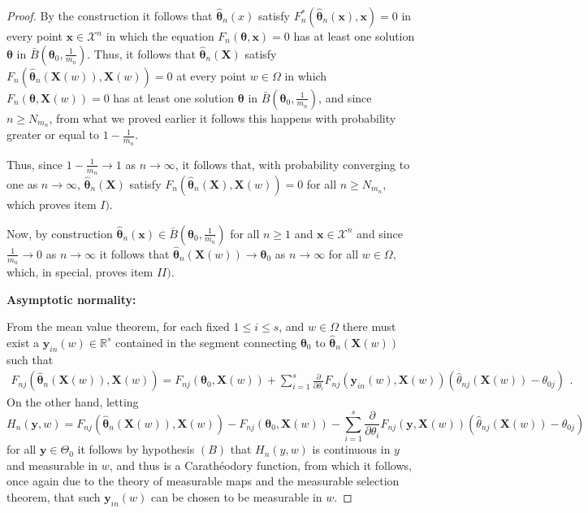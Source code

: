\documentclass[lineno]{biometrika}
\newcommand{\bs}{\boldsymbol}
\begin{document}
\begin{proof}
By the construction it follows that
$\bs{\hat{\theta}}_n(x)$ satisfy $F^*_n(\bs{\hat{\theta}}_n(\bs{x}),\bs{x})=0$ in every point $\bs{x}\in \mathcal{X}^n$ in which the equation $F_n(\bs{\theta},\bs{x})=0$ has at least one solution $\bs{\theta}$ in $\bar{B}\left(\bs{\theta}_0,\frac{1}{m_n}\right)$.
Thus, it follows that $\bs{\hat{\theta}}_n(\bs{X})$ satisfy $F_n(\bs{\hat{\theta}}_n(\bs{X}(w)),\bs{X}(w))=0$ at every point $w\in \Omega$ in which $F_n(\bs{\theta},\bs{X}(w))=0$ has at least one solution $\bs{\theta}$ in $\bar{B}\left(\bs{\theta}_0,\frac{1}{m_n}\right)$, and since $n\geq N_{m_n}$, from what we proved earlier it follows this happens with probability greater or equal to $1-\frac{1}{m_n}$. 

Thus, since $1-\frac{1}{m_n}\to 1$ as $n\to \infty$, it follows that, with probability converging to one as $n\to \infty$, $\hat{\bs{\theta}}_n(\bs{X})$ satisfy $F_n\left(\bs{\hat{\theta}}_n(\bs{X}),\bs{X}(w)\right)=0$ for all $n\geq N_{m_n}$, which proves item $I)$.

Now, by construction $\bs{\hat{\theta}}_n(\bs{x})\in \bar{B}\left(\bs{\theta}_0,\frac{1}{m_n}\right)$ for all $n\geq 1$ and $\bs{x}\in \mathcal{X}^n$ and since $\frac{1}{m_n}\to 0$ as $n\to \infty$ it follows that $\bs{\hat{\theta}}_n(\bs{X}(w)) \to \bs{\theta}_0$ as $n\to \infty$ for all $w\in \Omega$, which, in special, proves item $II)$.

\noindent\textbf{Asymptotic normality:}
\vspace{0.3cm}

From the mean value theorem, for each fixed $1\leq i\leq s$, and $w\in \Omega$ there must exist a $\bs{y}_{in}(w) \in \mathbb{R}^s$ contained in the segment connecting $\bs{\theta}_0$ to $\bs{\hat{\theta}}_n(\bs{X}(w))$ such that
\begin{equation}\label{eqF_n}
\begin{aligned}
F_{nj}(\bs{\hat{\theta}}_n(\bs{X}(w)),\bs{X}(w)) = F_{nj}(\bs{\theta}_0,\bs{X}(w)) + \sum_{i=1}^s  \frac{\partial}{\partial \theta_i} F_{nj}(\bs{y}_{in}(w),\bs{X}(w)) (\hat{\theta}_{nj}(\bs{X}(w)) - \theta_{0j})
\end{aligned}.
\end{equation}
On the other hand, letting
\begin{equation*}H_n(\bs{y},w) = F_{nj}(\bs{\hat{\theta}}_n(\bs{X}(w)),\bs{X}(w)) - F_{nj}(\bs{\theta}_0,\bs{X}(w)) - \sum_{i=1}^s  \frac{\partial}{\partial \theta_i} F_{nj}(\bs{y},\bs{X}(w)) (\hat{\theta}_{nj}(\bs{X}(w)) - \theta_{0j})
\end{equation*}
for all $\bs{y}\in \Theta_0$
it follows by hypothesis $(B)$ that $H_n(y,w)$ is continuous in $y$ and measurable in $w$, and thus is a Carathéodory function,
from which it follows, once again due to the theory of measurable maps and the measurable selection theorem, that such $\bs{y}_{in}(w)$ can be chosen to be measurable in $w$.


\end{proof}
\end{document}
